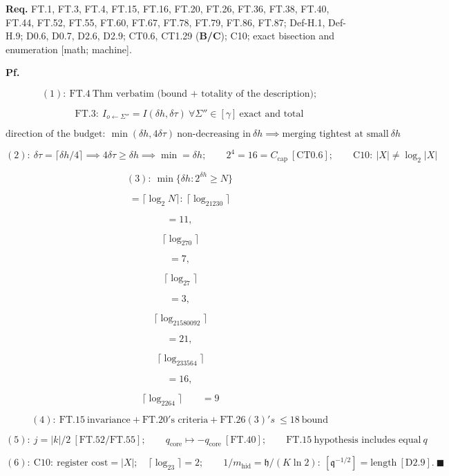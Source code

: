 \documentclass[11pt,openany]{report}
\theoremstyle{canonplain}
\theoremstyle{canondef}
\begin{document}
\textbf{Req.} FT.1, FT.3, FT.4, FT.15, FT.16, FT.20, FT.26, FT.36, FT.38, FT.40, FT.44, FT.52, FT.55, FT.60, FT.67, FT.78, FT.79, FT.86, FT.87; Def-H.1, Def-H.9; D0.6, D0.7, D2.6, D2.9; CT0.6, CT1.29 (\textbf{B/C}); C10; exact bisection and enumeration [math; machine].

\textbf{Pf.}

\[
(1):\ \mathrm{FT.4}\ \text{Thm verbatim (bound + totality of the description)};
\]

\[
\qquad \mathrm{FT.3}:\ I_{o\leftarrow\Sigma''}=I(\delta h,\delta\tau)\ \forall\Sigma''\in[\gamma]\ \text{exact and total}
\]

\[
\text{direction of the budget}:\ \min(\delta h,4\delta\tau)\ \text{non-decreasing in}\ \delta h\implies\text{merging tightest at small}\ \delta h
\]

\[
(2):\ \delta\tau=\lceil\delta h/4\rceil\implies4\delta\tau\ge\delta h\implies\min=\delta h;\qquad2^4=16=C_{\mathrm{cap}}\ [\mathrm{CT0.6}];\qquad\mathrm{C10}:\ |X|\ne\log_2|X|
\]

\[
(3):\ \min\{\delta h:2^{\delta h}\ge N\}
\]

\[
= \lceil\log_2N\rceil:\ \lceil\log_21230\rceil
\]

\[
= 11,
\]

\[
\ \lceil\log_270\rceil
\]

\[
= 7,
\]

\[
\ \lceil\log_27\rceil
\]

\[
= 3,
\]

\[
\ \lceil\log_21580092\rceil
\]

\[
= 21,
\]

\[
\ \lceil\log_233564\rceil
\]

\[
= 16,
\]

\[
\ \lceil\log_2264\rceil\qquad = 9
\]

\[
(4):\ \mathrm{FT.15}\ \text{invariance}+\mathrm{FT.20}'\text{s criteria}+\mathrm{FT.26}(3)'s\ \le18\ \text{bound}
\]

\[
(5):\ j=|k|/2\ [\mathrm{FT.52}/\mathrm{FT.55}];\qquad q_{\mathrm{core}}\mapsto-q_{\mathrm{core}}\ [\mathrm{FT.40}];\qquad\mathrm{FT.15}\ \text{hypothesis includes equal}\ q
\]

\[
(6):\ \mathrm{C10}:\ \text{register cost}=|X|;\quad\lceil\log_23\rceil=2;\qquad1/m_{\mathrm{hid}}=\mathfrak h/(K\ln2):\ [\mathfrak q^{-1/2}]=\text{length}\ [\mathrm{D2.9}].\ \blacksquare
\]
\end{document}
